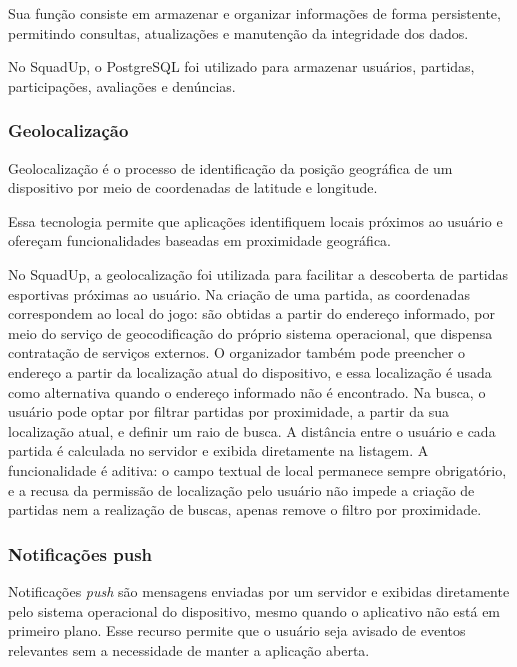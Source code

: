 \documentclass[a4paper, 12pt]{article}
\begin{document}
\begin{justify}
Sua função consiste em armazenar e organizar informações de forma persistente, permitindo consultas, atualizações e manutenção da integridade dos dados.

No SquadUp, o PostgreSQL foi utilizado para armazenar usuários, partidas, participações, avaliações e denúncias.

\subsubsection{Geolocalização}

Geolocalização é o processo de identificação da posição geográfica de um dispositivo por meio de coordenadas de latitude e longitude.

Essa tecnologia permite que aplicações identifiquem locais próximos ao usuário e ofereçam funcionalidades baseadas em proximidade geográfica.

No SquadUp, a geolocalização foi utilizada para facilitar a descoberta de partidas esportivas próximas ao usuário. Na criação de uma partida, as coordenadas correspondem ao local do jogo: são obtidas a partir do endereço informado, por meio do serviço de geocodificação do próprio sistema operacional, que dispensa contratação de serviços externos. O organizador também pode preencher o endereço a partir da localização atual do dispositivo, e essa localização é usada como alternativa quando o endereço informado não é encontrado. Na busca, o usuário pode optar por filtrar partidas por proximidade, a partir da sua localização atual, e definir um raio de busca. A distância entre o usuário e cada partida é calculada no servidor e exibida diretamente na listagem. A funcionalidade é aditiva: o campo textual de local permanece sempre obrigatório, e a recusa da permissão de localização pelo usuário não impede a criação de partidas nem a realização de buscas, apenas remove o filtro por proximidade.

\subsubsection{Notificações push}

Notificações \textit{push} são mensagens enviadas por um servidor e exibidas diretamente pelo sistema operacional do dispositivo, mesmo quando o aplicativo não está em primeiro plano. Esse recurso permite que o usuário seja avisado de eventos relevantes sem a necessidade de manter a aplicação aberta.


\end{justify}
\end{document}
